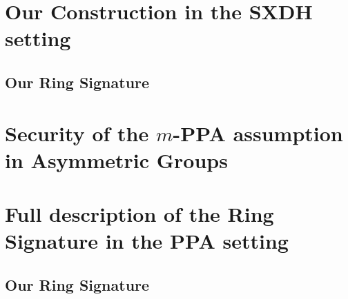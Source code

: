\documentclass{llncs}
\begin{document}
	
	\section{Our Construction in the SXDH setting} \label{sec:high-level}
        
        		
    	
		\subsection{Our Ring Signature}\label{sec:our-construction}
        		 
		







\appendix

	\section{Security of the $m$-PPA assumption in Asymmetric Groups} \label{sec:aPPA}
	
		
		

		
	\section{Full description of the Ring Signature in the PPA setting} \label{sec:ppa-full}
	\subsection{Our Ring Signature}\label{sec:our-construction-ppa}
        		 
		
\end{document}
